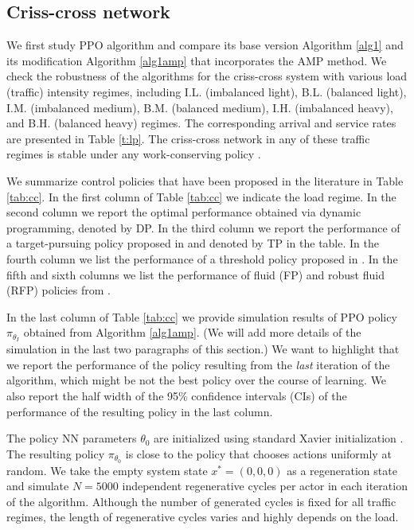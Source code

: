 \documentclass[11pt]{article}
\theoremstyle{definition}
\numberwithin{equation}{section}
\begin{document}
\subsection{Criss-cross network}\label{sec:cc}

 We first study PPO algorithm and compare its base version Algorithm \ref{alg1} and its modification Algorithm \ref{alg1amp} that incorporates the  AMP method.  We check the robustness of the algorithms for the criss-cross system  with  various load (traffic) intensity regimes, including    I.L. (imbalanced light), B.L. (balanced light), I.M. (imbalanced medium), B.M. (balanced medium), I.H. (imbalanced heavy), and B.H. (balanced heavy) regimes.   The corresponding arrival and service rates are presented in Table \ref{t:lp}. The criss-cross network in any of these traffic regimes is stable under any work-conserving policy  \cite{Dai1996}.






We summarize control policies that have been proposed in the literature in Table \ref{tab:cc}. In the first column of Table \ref{tab:cc} we indicate the load regime. In the second column we report the optimal performance obtained via dynamic programming, denoted by DP.  In the third column
we report the performance of a target-pursuing
policy proposed in \cite{Paschalidis2004} and denoted by TP in the table. In the fourth column we list the performance of a threshold policy proposed in \cite{Harrison1990}.
 In the fifth and sixth columns
we list the performance of fluid (FP) and robust fluid (RFP) policies from  \cite{Bertsimas2015}.

In the last column of Table \ref{tab:cc} we provide simulation results of PPO policy $\pi_{\theta_I}$ obtained from Algorithm \ref{alg1amp}.  (We will add more details of the simulation in the last two paragraphs of this section.)
We want to highlight that we report the performance of the policy resulting from the \textit{last} iteration of the algorithm, which might be not the best policy over the course of learning. We also report  the half width of the  95\% confidence intervals (CIs) of the performance of the resulting policy  in the last column.

The policy NN parameters $\theta_0$ are initialized using standard Xavier initialization \cite{Glorot2010}.  The resulting policy $\pi_{\theta_0}$ is close to the policy that chooses actions uniformly at random.  We take the empty system state $x^* = (0,0,0)$ as a regeneration state and simulate $N=5000$ independent regenerative cycles  per actor in each iteration of the algorithm. Although the number of generated cycles is fixed for all traffic regimes, the length of regenerative cycles varies  and highly depends on the load.
\end{document}
